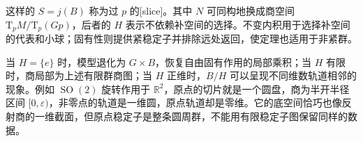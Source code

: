 这样的 \(S=j(B)\) 称为过 \(p\) 的[slice]。其中 \(N\) 可同构地换成商空间 \(\mathrm{T}_pM/\mathrm{T}_p(Gp)\)，后者的 \(H\) 表示不依赖补空间的选择。不变内积用于选择补空间的代表和小球；固有性则提供紧稳定子并排除远处返回，使定理也适用于非紧群。

\ProseParagraphBreak

当 \(H=\{e\}\) 时，模型退化为 \(G\times B\)，恢复自由固有作用的局部乘积；当 \(H\) 有限时，商局部为上述有限群商图；当 \(H\) 正维时，\(B/H\) 可以呈现不同维数轨道相邻的现象。例如 \(\operatorname{SO}(2)\) 旋转作用于 \(\mathbb R^2\)，原点的切片就是一个圆盘，商为半开半径区间 \([0,\varepsilon)\)，非零点的轨道是一维圆，原点轨道却是零维。它的底空间恰巧也像反射商的一维截面，但原点稳定子是整条圆周群，不能用有限稳定子图保留同样的数据。
